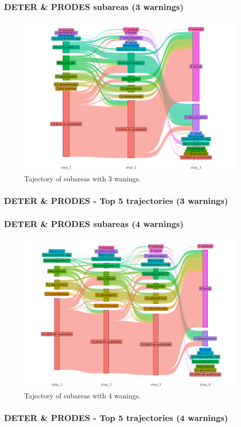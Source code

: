 \documentclass[aspectratio=169]{beamer}
\begin{document}
\begin{frame}
    \frametitle{DETER \& PRODES subareas (3 warnings)}
    \begin{figure}[h] 
        \includegraphics[width=0.65\linewidth]
        {./figures/plot_deter_prodes_subarea_trajectory_3.png}
        \caption{Tajectory of subareas with 3 wanings.}
        \label{fig:deter_prodes_subarea_trajectory_3}
    \end{figure}
\end{frame}

\begin{frame}[allowframebreaks]
    \frametitle{DETER \& PRODES - Top 5 trajectories (3 warnings)}
    
\end{frame}

\begin{frame}
    \frametitle{DETER \& PRODES subareas (4 warnings)}
    \begin{figure}[h] 
        \includegraphics[width=0.65\linewidth]
        {./figures/plot_deter_prodes_subarea_trajectory_4.png}
        \caption{Tajectory of subareas with 4 wanings.}
        \label{fig:deter_prodes_subarea_trajectory_4}
    \end{figure}
\end{frame}

\begin{frame}[allowframebreaks]
    \frametitle{DETER \& PRODES - Top 5 trajectories (4 warnings)}
    
\end{frame}
\end{document}
